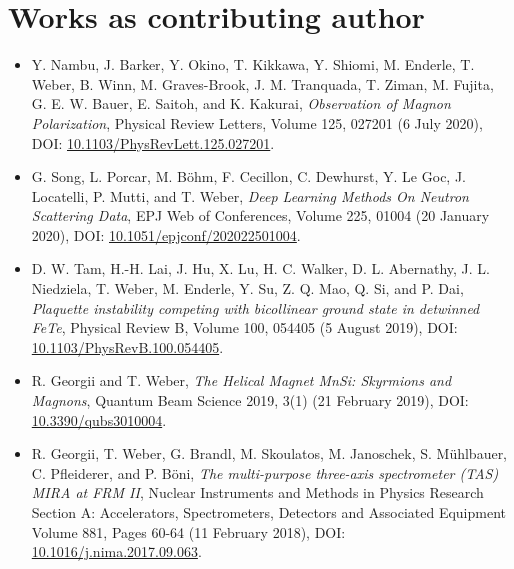 \section{Works as contributing author}

\begin{itemize}
	\item Y. Nambu, J. Barker, Y. Okino, T. Kikkawa, Y. Shiomi, M. Enderle, T. Weber, B. Winn, M. Graves-Brook, J. M. Tranquada, T. Ziman, M. Fujita, G. E. W. Bauer, E. Saitoh, and K. Kakurai, 
	\textit{Observation of Magnon Polarization},
	Physical Review Letters, Volume 125, 027201 (6 July 2020),
	DOI: \href{https://doi.org/10.1103/PhysRevLett.125.027201}{10.1103/PhysRevLett.125.027201}.

	\item G. Song, L. Porcar, M. B\"ohm, F. Cecillon, C. Dewhurst, Y. Le Goc, J. Locatelli, P. Mutti, and T. Weber, 
	\textit{Deep Learning Methods On Neutron Scattering Data},
	EPJ Web of Conferences, Volume 225, 01004 (20 January 2020),
	DOI: \href{https://doi.org/10.1051/epjconf/202022501004}{10.1051/epjconf/202022501004}.

	\item D. W. Tam, H.-H. Lai, J. Hu, X. Lu, H. C. Walker, D. L. Abernathy, J. L. Niedziela, T. Weber, M. Enderle, Y. Su, Z. Q. Mao, Q. Si, and P. Dai,
	\textit{Plaquette instability competing with bicollinear ground state in detwinned FeTe},
	Physical Review B, Volume 100, 054405 (5 August 2019),
	DOI: \href{https://doi.org/10.1103/PhysRevB.100.054405}{10.1103/PhysRevB.100.054405}.
	
	\item R. Georgii and T. Weber,
	\textit{The Helical Magnet MnSi: Skyrmions and Magnons},
	Quantum Beam Science 2019, 3(1) (21 February 2019),
	DOI: \href{https://doi.org/10.3390/qubs3010004}{10.3390/qubs3010004}.
	
	\item R. Georgii, T. Weber, G. Brandl, M. Skoulatos, M. Janoschek, S. Mühlbauer, C. Pfleiderer, and P. B\"oni,
	\textit{The multi-purpose three-axis spectrometer (TAS) MIRA at FRM II},
	Nuclear Instruments and Methods in Physics Research Section A: Accelerators, Spectrometers, Detectors and Associated Equipment Volume 881, Pages 60-64 (11 February 2018),
	DOI: \href{https://doi.org/10.1016/j.nima.2017.09.063}{10.1016/j.nima.2017.09.063}.
\end{itemize}
